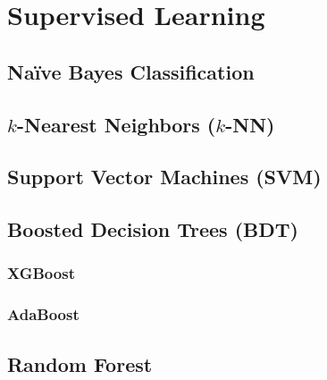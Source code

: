 \section{Supervised Learning}
\label{ml:supervised}

\subsection{N{a\"i}ve Bayes Classification}
\label{ml:supervised:Bayes}

\subsection{\texorpdfstring{$k$}{k}-Nearest Neighbors (\texorpdfstring{$k$}{k}-NN)}
\label{ml:supervised:kNN}

\subsection{Support Vector Machines (SVM)}
\label{ml:supervised:SVM}

\subsection{Boosted Decision Trees (BDT)}
\label{ml:supervised:BDT}

\subsubsection{XGBoost}%
\label{ml:supervised:BDT:xgboost}
\xgboost \cite{xgboost}

\subsubsection{AdaBoost}
\label{ml:supervised:BDT:AdaBoost}

\subsection{Random Forest}
\label{ml:supervised:RF}

